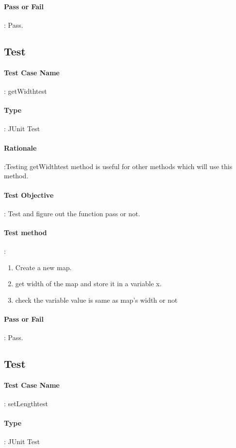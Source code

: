 \documentclass[12pt, a4paper]{report}
\begin{document}
\paragraph{Pass or Fail}: Pass.

\addtocounter{casecounter}{1}
\subsection{Test }
\paragraph{Test Case Name}: getWidthtest
\paragraph{Type}: JUnit Test
\paragraph{Rationale}:Testing getWidthtest method is useful for other methods which will use this method.
\paragraph{Test Objective}: Test and figure out the function pass or not.
\paragraph{Test method}: 
\begin{enumerate}
	\item Create a new map.
	\item get width of the map and store it in a variable x.
	\item check the variable value is same as map's width or not
\end{enumerate}
\paragraph{Pass or Fail}: Pass.

\addtocounter{casecounter}{1}
\subsection{Test }
\paragraph{Test Case Name}: setLengthtest
\paragraph{Type}: JUnit Test
\end{document}
